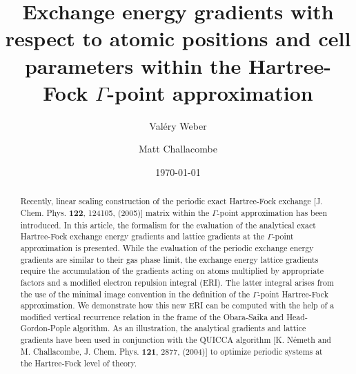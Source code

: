 \documentclass[prl,twocolumn,showpacs,twocolumngrid,superbib]{revtex4}
\begin{document}

\title{Exchange energy gradients with respect to atomic positions and cell parameters
  within the Hartree-Fock $\Gamma$-point approximation}

\author{Val\'ery Weber}
%
\author{Matt Challacombe}%
%

\date{\today}%


\begin{abstract}
  Recently, linear scaling construction of the periodic exact Hartree-Fock exchange 
  [J. Chem. Phys. {\bf 122}, 124105, (2005)]
  matrix within the $\Gamma$-point approximation
  has been introduced. In this article, the formalism for the evaluation of 
  the analytical exact Hartree-Fock exchange energy gradients and lattice gradients at 
  the $\Gamma$-point approximation is presented. While the evaluation of the
  periodic exchange energy gradients are similar to their gas phase limit, the exchange
  energy lattice gradients require the accumulation of the gradients acting on atoms multiplied 
  by appropriate factors and a modified electron repulsion integral (ERI). The latter
  integral arises from the use of the minimal image convention 
  in the definition of the $\Gamma$-point Hartree-Fock approximation. 
  We demonstrate how
  this new ERI can be computed with the help of a modified vertical 
  recurrence relation in the frame of the Obara-Saika and Head-Gordon-Pople 
  algorithm.  As an illustration, the analytical gradients and lattice gradients have been used 
  in conjunction with the QUICCA algorithm [K. N\'emeth and M. Challacombe,
  J. Chem. Phys. {\bf 121}, 2877, (2004)] to optimize periodic 
  systems at the Hartree-Fock level of theory.
\end{abstract}

\maketitle
\end{document}
